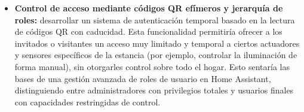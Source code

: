\begin{itemize}
    \item \textbf{Control de acceso mediante códigos QR efímeros y jerarquía de roles:} desarrollar un sistema de autenticación temporal basado en la lectura de códigos QR con caducidad. Esta funcionalidad permitiría ofrecer a los invitados o visitantes un acceso muy limitado y temporal a ciertos actuadores y sensores específicos de la estancia (por ejemplo, controlar la iluminación de forma manual), sin otorgarles control sobre todo el hogar. Esto sentaría las bases de una gestión avanzada de roles de usuario en Home Assistant, distinguiendo entre administradores con privilegios totales y usuarios finales con capacidades restringidas de control.
\end{itemize}